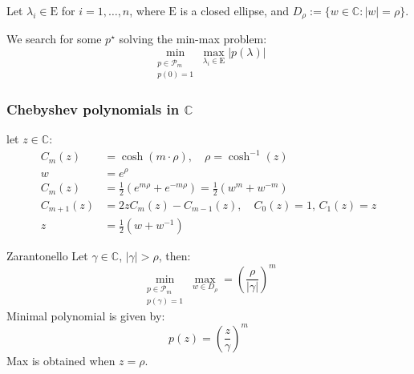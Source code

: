 
Let $\lambda_i \in \mathrm{E}$ for $i = 1, \ldots, n$, where $\mathrm{E}$ is a closed ellipse, and $D_\rho := \{w \in \mathbb{C} : |w| = \rho\}$.

We search for some $p^\star$ solving the min-max problem:
\[
    \min_{\substack{p \in \mathcal{P}_m \\ p(0) = 1}} \max_{\lambda_i \in \mathrm{E}} |p(\lambda)|
\]

\subsubsection{Chebyshev polynomials in $\mathbb{C}$}
let $z \in \mathbb{C}$:
\begin{align*}
    C_m(z)     & = \cosh(m \cdot \rho), \quad \rho = \cosh^{-1}(z)                 \\
    w          & = e^{\rho}                                                        \\
    C_m(z)     & = \frac{1}{2}(e^{m\rho} + e^{-m\rho}) = \frac{1}{2}(w^m + w^{-m}) \\
    C_{m+1}(z) & = 2zC_m(z) - C_{m-1}(z), \quad C_0(z) = 1, \, C_1(z) = z          \\
    z          & = \frac{1}{2}(w + w^{-1})
\end{align*}

\begin{lemma}{Zarantonello}{}
    Let $\gamma \in \mathbb{C}$, $|\gamma| > \rho$, then:
    \[
        \min_{\substack{p \in \mathcal{P}_m \\ p(\gamma) = 1}} \max_{w \in D_\rho} = \left(\frac{\rho}{|\gamma|}\right)^m
    \]
    Minimal polynomial is given by:
    \[
        p(z) = \left(\frac{z}{\gamma}\right)^m
    \]
    Max is obtained when $z = \rho$.
\end{lemma}

